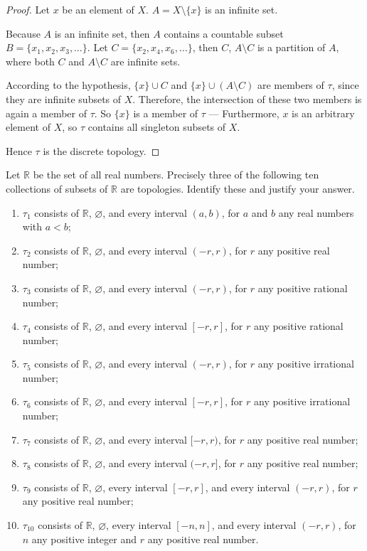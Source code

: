 \begin{proof}
	Let $x$ be an element of $X$. $A = X\setminus\{ x \}$ is an infinite set.

	Because $A$ is an infinite set, then $A$ contains a countable subset $B = \{ x_{1}, x_{2}, x_{3}, \ldots \}$. Let $C = \{ x_{2}, x_{4}, x_{6}, \ldots \}$, then $C$, $A\setminus C$ is a partition of $A$, where both $C$ and $A\setminus C$ are infinite sets.

	According to the hypothesis, $\{ x \}\cup C$ and $\{ x \}\cup (A\setminus C)$ are members of $\tau$, since they are infinite subsets of $X$. Therefore, the intersection of these two members is again a member of $\tau$. So $\{ x \}$ is a member of $\tau$ --- Furthermore, $x$ is an arbitrary element of $X$, so $\tau$ contains all singleton subsets of $X$.

	Hence $\tau$ is the discrete topology.
\end{proof}
\newpage

\begin{exercise}
	Let $\mathbb{R}$ be the set of all real numbers. Precisely three of the following ten collections of subsets of $\mathbb{R}$ are topologies. Identify these and justify your answer.
	\begin{enumerate}[label={(\roman*)}]
		\item $\tau_{1}$ consists of $\mathbb{R}$, $\varnothing$, and every interval $(a, b)$, for $a$ and $b$ any real numbers with $a < b$;
		\item $\tau_{2}$ consists of $\mathbb{R}$, $\varnothing$, and every interval $(-r, r)$, for $r$ any positive real number;
		\item $\tau_{3}$ consists of $\mathbb{R}$, $\varnothing$, and every interval $(-r, r)$, for $r$ any positive rational number;
		\item $\tau_{4}$ consists of $\mathbb{R}$, $\varnothing$, and every interval $[-r, r]$, for $r$ any positive rational number;
		\item $\tau_{5}$ consists of $\mathbb{R}$, $\varnothing$, and every interval $(-r, r)$, for $r$ any positive irrational number;
		\item $\tau_{6}$ consists of $\mathbb{R}$, $\varnothing$, and every interval $[-r, r]$, for $r$ any positive irrational number;
		\item $\tau_{7}$ consists of $\mathbb{R}$, $\varnothing$, and every interval $[-r, r)$, for $r$ any positive real number;
		\item $\tau_{8}$ consists of $\mathbb{R}$, $\varnothing$, and every interval $(-r, r]$, for $r$ any positive real number;
		\item $\tau_{9}$ consists of $\mathbb{R}$, $\varnothing$, every interval $[-r, r]$, and every interval $(-r, r)$, for $r$ any positive real number;
		\item $\tau_{10}$ consists of $\mathbb{R}$, $\varnothing$, every interval $[-n, n]$, and every interval $(-r, r)$, for $n$ any positive integer and $r$ any positive real number.
	\end{enumerate}
\end{exercise}


